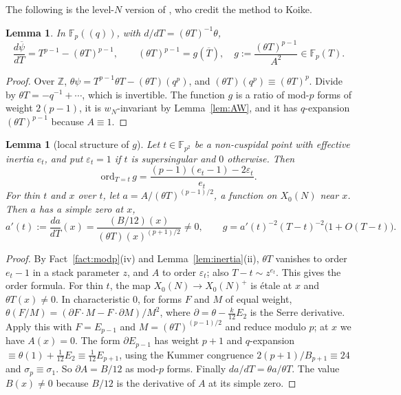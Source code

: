\documentclass[11pt,a4paper]{article}
\numberwithin{equation}{section}
\newtheorem{lemma}[theorem]{Lemma}
\theoremstyle{definition}
\theoremstyle{remark}
\newcommand{\Fp}{\mathbb F_p}
\newcommand{\Fq}{\mathbb F_{p^2}}
\newcommand{\Z}{\mathbb Z}
\begin{document}
The following is the level-$N$ version of \citet[\S10, (35)--(38)]{KZ98}, who credit the method to Koike.

\begin{lemma}\label{lem:dpsi}
In $\Fp((q))$, with $d/dT=(\theta T)^{-1}\theta$,
\[
\frac{d\overline\psi}{dT}=T^{p-1}-(\theta T)^{p-1},\qquad (\theta T)^{p-1}=g(\overline T),\quad
g:=\frac{(\theta T)^{p-1}}{A^2}\in\Fp(T).
\]
\end{lemma}
\begin{proof}
Over $\Z$, $\theta\psi=T^{p-1}\theta T-(\theta T)(q^p)$, and $(\theta T)(q^p)\equiv(\theta T)^p$.
Divide by $\theta T=-q^{-1}+\cdots$, which is invertible. The function $g$ is a ratio of mod-$p$
forms of weight $2(p-1)$, it is $w_N$-invariant by Lemma~\ref{lem:AW}, and it has $q$-expansion
$(\theta T)^{p-1}$ because $A\equiv1$.
\end{proof}

\begin{lemma}[local structure of $g$]\label{lem:g}
Let $t\in\Fq$ be a non-cuspidal point with effective inertia $e_t$, and put $\varepsilon_t=1$ if
$t$ is supersingular and $0$ otherwise. Then
\[
\mathrm{ord}_{T=t}\,g=\frac{(p-1)(e_t-1)-2\varepsilon_t}{e_t}.
\]
For thin $t$ and $x$ over $t$, let $a=A/(\theta T)^{(p-1)/2}$, a function on $X_0(N)$ near $x$.
Then $a$ has a simple zero at $x$,
\[
a'(t):=\frac{da}{dT}(x)=\frac{(B/12)(x)}{(\theta T)(x)^{(p+1)/2}}\ne0,
\qquad g=a'(t)^{-2}(T-t)^{-2}\bigl(1+O(T-t)\bigr).
\]
\end{lemma}
\begin{proof}
By Fact~\ref{fact:modp}(iv) and Lemma~\ref{lem:inertia}(ii), $\theta T$ vanishes to order $e_t-1$ in a
stack parameter $z$, and $A$ to order $\varepsilon_t$; also $T-t\sim z^{e_t}$. This gives the order formula.
For thin $t$, the map $X_0(N)\to X_0(N)^+$ is \'etale at $x$ and $\theta T(x)\ne0$. In
characteristic $0$, for forms $F$ and $M$ of equal weight,
$\theta(F/M)=(\partial F\cdot M-F\cdot\partial M)/M^2$, where $\partial=\theta-\frac{k}{12}E_2$ is the
Serre derivative. Apply this with $F=E_{p-1}$ and $M=(\theta T)^{(p-1)/2}$ and reduce modulo $p$; at
$x$ we have $A(x)=0$. The form $\partial E_{p-1}$ has weight $p+1$ and $q$-expansion
$\equiv\theta(1)+\frac1{12}E_2\equiv\frac1{12}E_{p+1}$, using the Kummer congruence
$2(p+1)/B_{p+1}\equiv24$ and $\sigma_p\equiv\sigma_1$. So $\partial A=B/12$ as mod-$p$ forms. Finally
$da/dT=\theta a/\theta T$. The value $B(x)\ne0$ because $B/12$ is the derivative of $A$ at its simple zero.
\end{proof}
\end{document}
